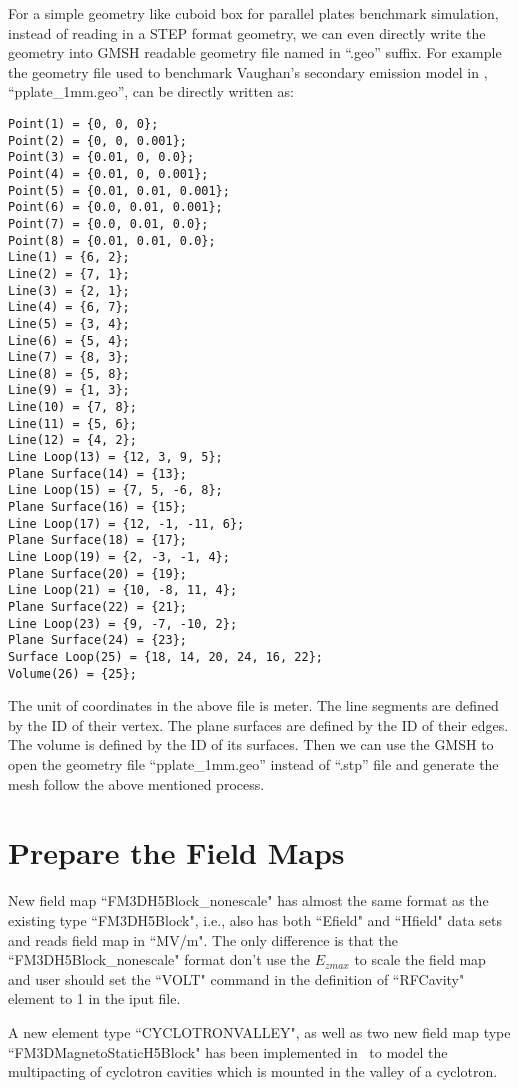 \documentclass[a4paper,11pt]{article}
\begin{document}
For a simple geometry like cuboid box for parallel plates benchmark simulation, instead of reading in a STEP format geometry, we can even directly write the geometry into GMSH readable geometry file named in ``.geo'' suffix. For example the geometry file used to benchmark Vaughan's secondary emission model in \opal, ``pplate\_1mm.geo'', can be directly written as:
\begin{verbatim}
Point(1) = {0, 0, 0};
Point(2) = {0, 0, 0.001};
Point(3) = {0.01, 0, 0.0};
Point(4) = {0.01, 0, 0.001};
Point(5) = {0.01, 0.01, 0.001};
Point(6) = {0.0, 0.01, 0.001};
Point(7) = {0.0, 0.01, 0.0};
Point(8) = {0.01, 0.01, 0.0};
Line(1) = {6, 2};
Line(2) = {7, 1};
Line(3) = {2, 1};
Line(4) = {6, 7};
Line(5) = {3, 4};
Line(6) = {5, 4};
Line(7) = {8, 3};
Line(8) = {5, 8};
Line(9) = {1, 3};
Line(10) = {7, 8};
Line(11) = {5, 6};
Line(12) = {4, 2};
Line Loop(13) = {12, 3, 9, 5};
Plane Surface(14) = {13};
Line Loop(15) = {7, 5, -6, 8};
Plane Surface(16) = {15};
Line Loop(17) = {12, -1, -11, 6};
Plane Surface(18) = {17};
Line Loop(19) = {2, -3, -1, 4};
Plane Surface(20) = {19};
Line Loop(21) = {10, -8, 11, 4};
Plane Surface(22) = {21};
Line Loop(23) = {9, -7, -10, 2};
Plane Surface(24) = {23};
Surface Loop(25) = {18, 14, 20, 24, 16, 22};
Volume(26) = {25};
\end{verbatim}
The unit of coordinates in the above file is meter. The line segments are defined by the ID of their vertex. The plane surfaces are defined by the ID of their edges. The volume is defined by the ID of its surfaces. Then we can use the GMSH to open the geometry file ``pplate\_1mm.geo'' instead of ``.stp'' file and generate the mesh follow the above mentioned process.
\section{Prepare the Field Maps}
New field map ``FM3DH5Block\_nonescale" has almost the same format as the existing type ``FM3DH5Block", i.e., also has both ``Efield" and ``Hfield" data sets and reads field map in ``MV/m". The only difference is that the ``FM3DH5Block\_nonescale" format don't use the $E_{zmax}$ to scale the field map and user should set the ``VOLT" command in the definition of ``RFCavity" element to 1 in the iput file.  

A new element type ``CYCLOTRONVALLEY", as well as two new field map type ``FM3DMagnetoStaticH5Block" has been implemented in \opal\ to model the multipacting of cyclotron cavities which is mounted in the valley of a cyclotron. 
\end{document}
